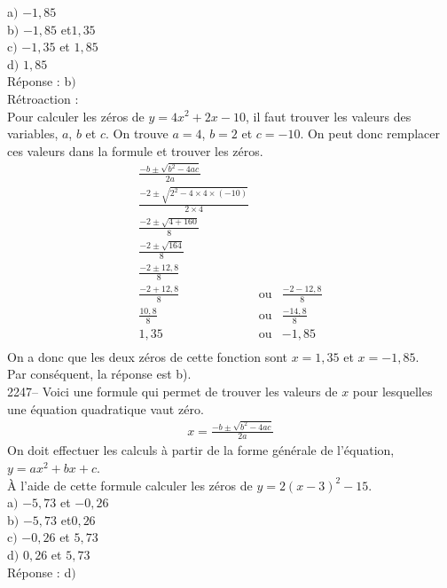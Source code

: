 \documentclass[letterpaper, 12pt]{article}
\begin{document}
a$)$ $-1,85$\\
b$)$ $-1,85$ et$ 1,35$\\
c$)$ $-1,35$ et $1,85$\\
d$)$ $1,85$\\

R\'eponse : b$)$\\

R\'etroaction :\\
Pour calculer les z\'eros de $y=4x^{2}+2x-10$, il faut trouver les valeurs des variables, $a$, $b$ et $c$. On trouve $a=4$, $b=2$ et $c=-10$. On peut donc remplacer ces valeurs dans la formule et trouver les z\'eros.
\begin{eqnarray*}
 \frac{-b\pm\sqrt{b^{2}-4ac}}{2a}\\
 \frac{-2\pm\sqrt{2^{2}-4\times 4 \times (-10)}}{2\times 4}\\
 \frac{-2\pm\sqrt{4+160}}{8}\\
 \frac{-2\pm\sqrt{164}}{8}\\
 \frac{-2\pm12,8}{8}\\
 \frac{-2+12,8}{8} &\textrm{ou}& \frac{-2-12,8}{8}\\
 \frac{10,8}{8} &\textrm{ou}& \frac{-14,8}{8}\\
 1,35 &\textrm{ou}& -1,85\\
\end{eqnarray*}
On a donc que  les deux z\'eros de cette fonction sont $x=1,35$ et $x=-1,85$.\\
Par cons\'equent, la r\'eponse est b).\\

2247-- Voici une formule qui permet de trouver les valeurs de $x$ pour lesquelles une \'equation quadratique vaut z\'ero.
\begin{eqnarray*}
 x=\frac{-b\pm\sqrt{b^{2}-4ac}}{2a}
\end{eqnarray*}
On doit effectuer les calculs \`a partir de la forme g\'en\'erale de l'\'equation, $y=ax^{2}+bx+c$.\\
\`A l'aide de cette formule calculer les z\'eros de $y=2(x-3)^{2}-15$.\\

a$)$ $-5,73$ et $-0,26$\\
b$)$ $-5,73$ et$ 0,26$\\
c$)$ $-0,26$ et $5,73$\\
d$)$ $0,26$ et $5,73$\\

R\'eponse : d$)$\\
\end{document}
